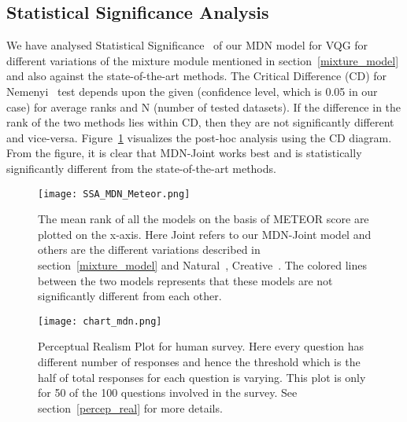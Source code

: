 \documentclass[11pt,a4paper]{article}
\begin{document}
\subsection{Statistical Significance Analysis}
We have analysed Statistical Significance~\cite{Demvsar_JMLR2006} of our MDN model for VQG for different  variations of the mixture module mentioned in section~\ref{mixture_model} and also against the state-of-the-art methods. 
The Critical Difference (CD) for Nemenyi~\cite{Fivser_PLOS2016} test depends upon the given  (confidence level, which is 0.05 in our case) for average ranks and N (number of tested datasets). If the difference in the rank of the two methods lies within CD, then they are not significantly different and vice-versa. Figure~\ref{fig:result_1_B} visualizes the post-hoc analysis using the CD diagram. From the figure, it is clear that MDN-Joint works best and is statistically significantly different from the state-of-the-art methods. 
\begin{figure}[ht]
	\centering
	\texttt{[image: SSA\_MDN\_Meteor.png]}
	\vspace{-0.35cm}
	\caption{The mean rank of all the models on the basis of METEOR score are plotted on the x-axis. Here Joint refers to our MDN-Joint model and others are the different variations described in section~\ref{mixture_model} and Natural~\cite{mostafazadeh2016generating}, Creative~\cite{jain2017creativity}. The colored lines between the two models represents that these models are not significantly different from each other.}
	\label{fig:result_1_B}
\end{figure}
\begin{figure}[ht]
	\centering
	\texttt{[image: chart\_mdn.png]}
	\vspace{-0.89cm}
	\caption{Perceptual Realism Plot for human survey. Here every question has different number of responses and hence the threshold which is the half of total responses for each question is varying. This plot is only for 50 of the 100 questions involved in the survey. See section~\ref{percep_real} for more details.}
	\label{fig:result_2_A}
\end{figure}
\end{document}
